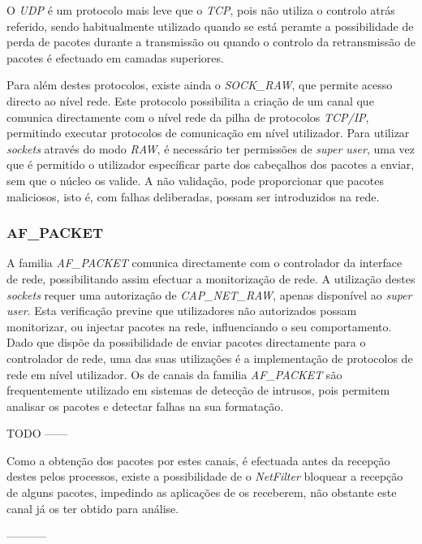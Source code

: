 O \textit{UDP} é um protocolo mais leve que o \textit{TCP}, pois não utiliza o controlo atrás referido, sendo habitualmente utilizado quando se está peramte a possibilidade de perda de pacotes durante a transmissão ou quando o controlo da retransmissão de pacotes é efectuado em camadas superiores.

Para além destes protocolos, existe ainda o \textit{SOCK\_RAW}, que permite acesso directo ao nível rede.
Este protocolo possibilita a criação de um canal que comunica directamente com o nível rede da pilha de protocolos \textit{TCP/IP}, permitindo executar protocolos de comunicação em nível utilizador.
Para utilizar \textit{sockets} através do modo \textit{RAW}, é necessário ter permissões de \textit{super user}, uma vez que é permitido o utilizador específicar parte dos cabeçalhos dos pacotes a enviar, sem que o núcleo os valide.
A não validação, pode proporcionar que pacotes maliciosos, isto é, com falhas deliberadas, possam ser introduzidos na rede.
 


\subsubsection{AF\_PACKET}
\label{subsub:af_packet}

A familia \textit{AF\_PACKET} comunica directamente com o controlador da interface de rede, possibilitando assim efectuar a monitorização de rede.
A utilização destes \textit{sockets} requer uma autorização de \textit{CAP\_NET\_RAW}, apenas disponível ao \textit{super user}.
Esta verificação previne que utilizadores não autorizados possam monitorizar, ou injectar pacotes na rede, influenciando o seu comportamento.
Dado que dispõe da possibilidade de enviar pacotes directamente para o controlador de rede, uma das suas utilizações é a implementação de protocolos de rede em nível utilizador.
Os de canais da familia \textit{AF\_PACKET} são frequentemente utilizado em sistemas de detecção de intrusos, pois permitem analisar os pacotes e detectar falhas na sua formatação.

TODO ------

Como a obtenção dos pacotes por estes canais, é efectuada antes da recepção destes pelos processos, existe a possibilidade de o \textit{NetFilter} bloquear a recepção de alguns pacotes, impedindo as aplicações de os receberem, não obstante este canal já os ter obtido para análise.

-----------


 
